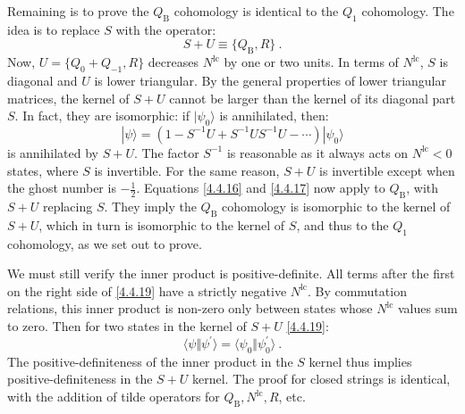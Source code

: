 Remaining is to prove the $Q_{\mathrm{B}}$ cohomology is identical to the $Q_{1}$ cohomology. The idea is to replace $S$ with the operator:
\begin{equation}
S+U \equiv\{Q_{\mathrm{B}}, R\} \:. \label{4.4.18}
\end{equation}
Now, $U=\{Q_{0}+Q_{-1}, R\}$ decreases $N^{\mathrm{lc}}$ by one or two units. In terms of $N^{\mathrm{lc}}$, $S$ is diagonal and $U$ is lower triangular. By the general properties of lower triangular matrices, the kernel of $S+U$ cannot be larger than the kernel of its diagonal part $S$. In fact, they are isomorphic: if $|\psi_{0}\rangle$ is annihilated, then:
\begin{equation}
|\psi\rangle=(1-S^{-1} U+S^{-1} U S^{-1} U-\cdots) |\psi_{0}\rangle \label{4.4.19}
\end{equation}
is annihilated by $S+U$. The factor $S^{-1}$ is reasonable as it always acts on $N^{\mathrm{lc}}<0$ states, where $S$ is invertible. For the same reason, $S+U$ is invertible except when the ghost number is $-\frac{1}{2}$. Equations \eqref{4.4.16} and \eqref{4.4.17} now apply to $Q_{\mathrm{B}}$, with $S+U$ replacing $S$. They imply the $Q_{\mathrm{B}}$ cohomology is isomorphic to the kernel of $S+U$, which in turn is isomorphic to the kernel of $S$, and thus to the $Q_{1}$ cohomology, as we set out to prove.

We must still verify the inner product is positive-definite. All terms after the first on the right side of \eqref{4.4.19} have a strictly negative $N^{\mathrm{lc}}$. By commutation relations, this inner product is non-zero only between states whose $N^{\mathrm{lc}}$ values sum to zero. Then for two states in the kernel of $S+U$ \eqref{4.4.19}:
\begin{equation}
\langle\psi \Vert \psi^{\prime}\rangle=\langle\psi_{0} \Vert \psi_{0}^{\prime}\rangle \:. \label{4.4.20}
\end{equation}
The positive-definiteness of the inner product in the $S$ kernel thus implies positive-definiteness in the $S+U$ kernel. The proof for closed strings is identical, with the addition of tilde operators for $Q_{\mathrm{B}}, N^{\mathrm{lc}}, R$, etc.

